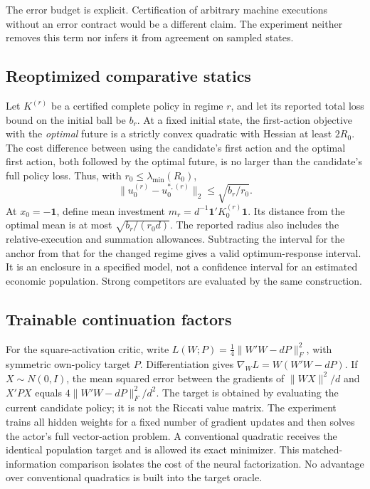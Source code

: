\documentclass[ecta,nameyear,draft]{econsocart}
\theoremstyle{definition}
\theoremstyle{remark}
\begin{document}
The error budget is explicit. Certification of arbitrary machine executions
without an error contract would be a different claim. The experiment neither
removes this term nor infers it from agreement on sampled states.

\subsection{Reoptimized comparative statics}
Let $K^{(r)}$ be a certified complete policy in regime $r$, and let its
reported total loss bound on the initial ball be $b_r$. At a fixed initial
state, the first-action objective with the \emph{optimal} future is a strictly
convex quadratic with Hessian at least $2R_0$. The cost difference between
using the candidate's first action and the optimal first action, both followed
by the optimal future, is no larger than the candidate's full policy loss.
Thus, with $r_0\leq\lambda_{\min}(R_0)$,
\begin{equation}
 \|u_0^{(r)}-u_0^{*,(r)}\|_2\leq\sqrt{b_r/r_0}.
 \label{eq:r23actionradius}
\end{equation}
At $x_0=-\mathbf1$, define mean investment
$m_r=d^{-1}\mathbf1'K_0^{(r)}\mathbf1$. Its distance from the optimal mean
is at most $\sqrt{b_r/(r_0d)}$. The reported radius also includes the
relative-execution and summation allowances. Subtracting the interval for
the anchor from that for the changed regime gives a valid optimum-response
interval. It is an enclosure in a specified model, not a confidence interval
for an estimated economic population. Strong competitors are evaluated by
the same construction.

\subsection{Trainable continuation factors}
For the square-activation critic, write
$L(W;P)=\frac14\|W'W-dP\|_F^2$, with symmetric own-policy target $P$.
Differentiation gives $\nabla_W L=W(W'W-dP)$. If $X\sim N(0,I)$, the mean
squared error between the gradients of $\|WX\|^2/d$ and $X'PX$ equals
$4\|W'W-dP\|_F^2/d^2$. The target is obtained by evaluating the current
candidate policy; it is not the Riccati value matrix. The experiment trains
all hidden weights for a fixed number of gradient updates and then solves
the actor's full vector-action problem. A conventional quadratic receives
the identical population target and is allowed its exact minimizer. This
matched-information comparison isolates the cost of the neural factorization.
No advantage over conventional quadratics is built into the target oracle.
\end{document}
